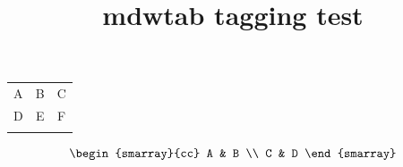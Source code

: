 \documentclass{article}
\title{mdwtab tagging test}
\begin{document}
\begin{tabular}{| c !{\vline[2pt]} c | c |}
A & B & C \\
D & E & F \\
\end{tabular}

\[
\begin{smarray}{cc}
A & B \\
C & D
\end{smarray}
\]
\end{document}
